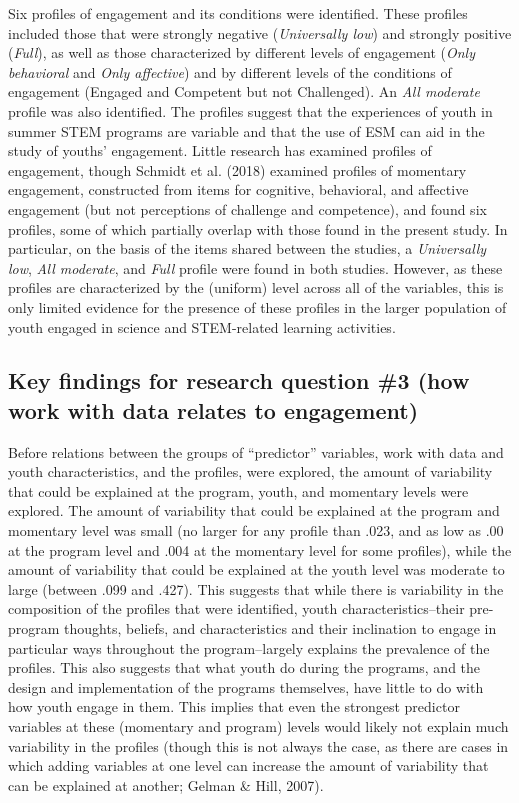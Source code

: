 \documentclass[]{msu-thesis}
\theoremstyle{definition}
\theoremstyle{definition}
\theoremstyle{definition}
\theoremstyle{remark}
\begin{document}
Six profiles of engagement and its conditions were identified. These
profiles included those that were strongly negative (\emph{Universally
low}) and strongly positive (\emph{Full}), as well as those
characterized by different levels of engagement (\emph{Only behavioral}
and \emph{Only affective}) and by different levels of the conditions of
engagement (Engaged and Competent but not Challenged). An \emph{All
moderate} profile was also identified. The profiles suggest that the
experiences of youth in summer STEM programs are variable and that the
use of ESM can aid in the study of youths' engagement. Little research
has examined profiles of engagement, though Schmidt et al. (2018)
examined profiles of momentary engagement, constructed from items for
cognitive, behavioral, and affective engagement (but not perceptions of
challenge and competence), and found six profiles, some of which
partially overlap with those found in the present study. In particular,
on the basis of the items shared between the studies, a
\emph{Universally low}, \emph{All moderate}, and \emph{Full} profile
were found in both studies. However, as these profiles are characterized
by the (uniform) level across all of the variables, this is only limited
evidence for the presence of these profiles in the larger population of
youth engaged in science and STEM-related learning activities.

\subsection{Key findings for research question \#3 (how work with data
relates to
engagement)}\label{key-findings-for-research-question-3-how-work-with-data-relates-to-engagement}

Before relations between the groups of ``predictor'' variables, work
with data and youth characteristics, and the profiles, were explored,
the amount of variability that could be explained at the program, youth,
and momentary levels were explored. The amount of variability that could
be explained at the program and momentary level was small (no larger for
any profile than .023, and as low as .00 at the program level and .004
at the momentary level for some profiles), while the amount of
variability that could be explained at the youth level was moderate to
large (between .099 and .427). This suggests that while there is
variability in the composition of the profiles that were identified,
youth characteristics--their pre-program thoughts, beliefs, and
characteristics and their inclination to engage in particular ways
throughout the program--largely explains the prevalence of the profiles.
This also suggests that what youth do during the programs, and the
design and implementation of the programs themselves, have little to do
with how youth engage in them. This implies that even the strongest
predictor variables at these (momentary and program) levels would likely
not explain much variability in the profiles (though this is not always
the case, as there are cases in which adding variables at one level can
increase the amount of variability that can be explained at another;
Gelman \& Hill, 2007).
\end{document}
